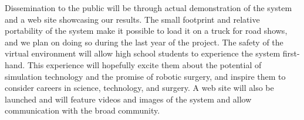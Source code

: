 Dissemination to the public will be through actual demonstration of the system and a web site showcasing our results. The small footprint and relative portability of the system make it possible to load it on a truck for road shows, and we plan on doing so during the last year of the project. The safety of the virtual environment will allow high school students to experience the system first-hand. This experience will hopefully excite them about the potential of simulation technology and the promise of robotic  surgery, and inspire them to consider careers in science, technology, and surgery. A web site will also be launched and will feature videos and images of the system and allow communication with the broad community.
